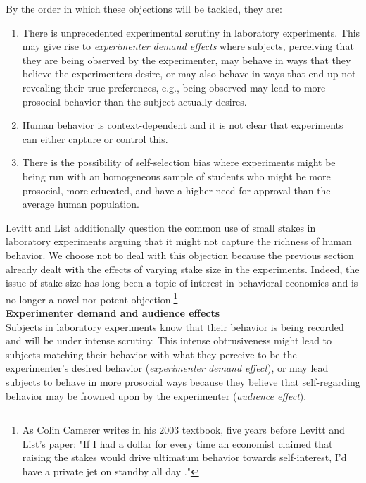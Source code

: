 \documentclass[12pt]{article}
\begin{document}
By the order in which these objections will be tackled, they are:

\begin{enumerate}
	\item There is unprecedented experimental scrutiny in laboratory experiments. This may give rise to \textit{experimenter demand effects} where subjects, perceiving that they are being observed by the experimenter, may behave in ways that they believe the experimenters desire, or may also behave in ways that end up not revealing their true preferences, e.g., being observed may lead to more prosocial behavior than the subject actually desires. 
	\item Human behavior is context-dependent and it is not clear that experiments can either capture or control this.
	\item There is the possibility of self-selection bias where experiments might be being run with an homogeneous sample of students who might be more prosocial, more educated, and have a higher need for approval than the average human population.
\end{enumerate}

Levitt and List additionally question the common use of small stakes in laboratory experiments arguing that it might not capture the richness of human behavior. We choose not to deal with this objection because the previous section already dealt with the effects of varying stake size in the experiments. Indeed, the issue of stake size has long been a topic of interest in behavioral economics \citep{camerer1999effects} and is no longer a novel nor potent objection.\footnote{As Colin Camerer writes in his 2003 textbook, five years before Levitt and List's paper: "If I had a dollar for every time an economist claimed that raising the stakes would drive ultimatum behavior towards self-interest, I'd have a private jet on standby all day \citep[p.~60]{camerer2011behavioral}."}
\\

\textbf{Experimenter demand and audience effects}
\\

Subjects in laboratory experiments know that their behavior is being recorded and will be under intense scrutiny. This intense obtrusiveness might lead to subjects matching their behavior with what they perceive to be the experimenter's desired behavior (\textit{experimenter demand effect}), or may lead subjects to behave in more prosocial ways because they believe that self-regarding behavior may be frowned upon by the experimenter (\textit{audience effect}).
\end{document}
